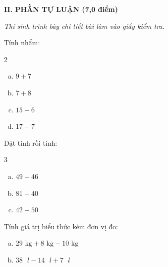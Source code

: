 \vspace{4mm}
\textbf{\large II. PHẦN TỰ LUẬN (7,0 điểm)}

{\itshape Thí sinh trình bày chi tiết bài làm vào giấy kiểm tra.}

\begin{bt}[1,0 điểm]
Tính nhẩm:
\begin{multicols}{2}
\begin{enumerate}[a)]
  \item $9 + 7$
  \item $7 + 8$
  \item $15 - 6$
  \item $17 - 7$
\end{enumerate}
\end{multicols}
\end{bt}

\begin{bt}[1,5 điểm]
Đặt tính rồi tính:
\begin{multicols}{3}
\begin{enumerate}[a)]
  \item $49 + 46$
  \item $81 - 40$
  \item $42 + 50$
\end{enumerate}
\end{multicols}
\end{bt}

\begin{bt}[1,0 điểm]
Tính giá trị biểu thức kèm đơn vị đo:
\begin{enumerate}[a)]
  \item $29\text{ kg} + 8\text{ kg} - 10\text{ kg}$
  \item $38\text{ }l - 14\text{ }l + 7\text{ }l$
\end{enumerate}
\end{bt}

